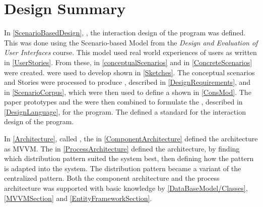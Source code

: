 \chapter{Design Summary}
In \cref{ScenarioBasedDesign}, , the interaction design of the program was defined. This was done using the Scenario-based Model from the \textit{Design and Evaluation of User Interfaces} course. This model used real world experiences of users as  written in \cref{UserStories}. From these,  in \cref{conceptualScenarios} and  in \cref{ConcreteScenarios} were created.  were used to develop  shown in \cref{Sketches}. The conceptual scenarios and Stories were processed to produce , described in  \cref{DesignRequirements}, and  in \cref{ScenarioCorpus}, which were then used to define a  shown in \cref{ConsMod}. The paper prototypes and the  were then combined to formulate the , described in \cref{DesignLanguage}, for the program. The  defined a standard for the interaction design of the program.  

In \cref{Architecture}, called , the  in  \cref{ComponentArchitecture} defined the architecture as MVVM. The  in \cref{ProcessArchitecture} defined the architecture, by finding which distribution pattern suited the system best, then defining how the pattern is adapted into the system. The distribution pattern became a variant of the centralized pattern. Both the component architecture and the process architecture was supported with basic knowledge by \cref{DataBaseModel/Classes}, \cref{MVVMSection} and \cref{EntityFrameworkSection}.   
